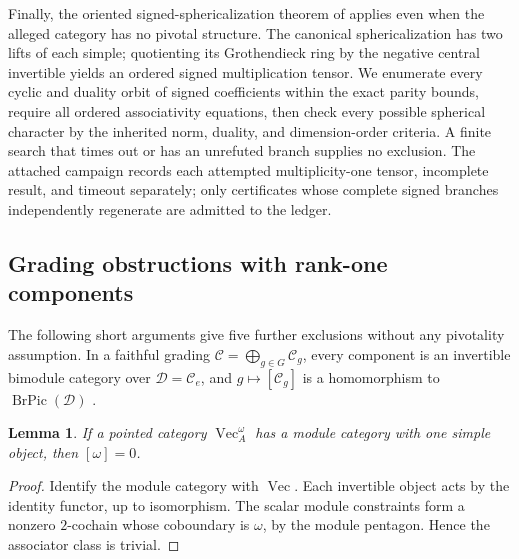 \documentclass[11pt,reqno]{amsart}
\newtheorem{lemma}[theorem]{Lemma}
\theoremstyle{definition}
\theoremstyle{remark}
\renewcommand{\Vec}{\operatorname{Vec}}
\begin{document}
Finally, the oriented signed-sphericalization theorem of \cite{R6,R7} applies even when the alleged category has no pivotal structure. The canonical sphericalization has two lifts of each simple; quotienting its Grothendieck ring by the negative central invertible yields an ordered signed multiplication tensor. We enumerate every cyclic and duality orbit of signed coefficients within the exact parity bounds, require all ordered associativity equations, then check every possible spherical character by the inherited norm, duality, and dimension-order criteria. A finite search that times out or has an unrefuted branch supplies no exclusion. The attached campaign records each attempted multiplicity-one tensor, incomplete result, and timeout separately; only certificates whose complete signed branches independently regenerate are admitted to the ledger.

\subsection{Grading obstructions with rank-one components}
The following short arguments give five further exclusions without any pivotality assumption. In a faithful grading $\mathcal C=\bigoplus_{g\in G}\mathcal C_g$, every component is an invertible bimodule category over $\mathcal D=\mathcal C_e$, and $g\mapsto[\mathcal C_g]$ is a homomorphism to $\operatorname{BrPic}(\mathcal D)$ \cite[Theorem~1.3 and Section~6]{ENOExt}.

\begin{lemma}\label{lem:rankone}
If a pointed category $\Vec_A^\omega$ has a module category with one simple object, then $[\omega]=0$.
\end{lemma}
\begin{proof}
Identify the module category with $\Vec$. Each invertible object acts by the identity functor, up to isomorphism. The scalar module constraints form a nonzero $2$-cochain whose coboundary is $\omega$, by the module pentagon. Hence the associator class is trivial.
\end{proof}
\end{document}
